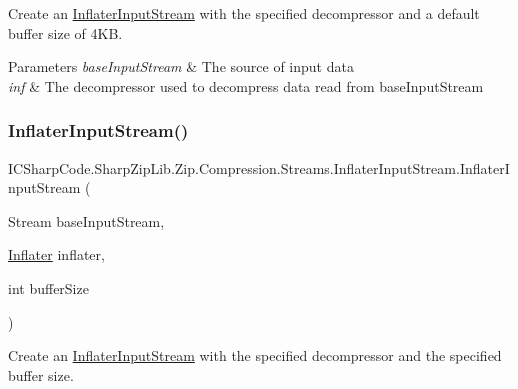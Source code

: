 Create an \hyperlink{class_i_c_sharp_code_1_1_sharp_zip_lib_1_1_zip_1_1_compression_1_1_streams_1_1_inflater_input_stream}{Inflater\+Input\+Stream} with the specified decompressor and a default buffer size of 4\+KB. 


\begin{DoxyParams}{Parameters}
{\em base\+Input\+Stream} & The source of input data \\
\hline
{\em inf} & The decompressor used to decompress data read from base\+Input\+Stream \\
\hline
\end{DoxyParams}
\mbox{\label{class_i_c_sharp_code_1_1_sharp_zip_lib_1_1_zip_1_1_compression_1_1_streams_1_1_inflater_input_stream_af988bfe68d18362c690e6f7cb0e7c0eb}} 
\subsubsection{\texorpdfstring{Inflater\+Input\+Stream()}{InflaterInputStream()}\hspace{0.1cm}{\footnotesize\ttfamily [6/6]}}
{\footnotesize\ttfamily I\+C\+Sharp\+Code.\+Sharp\+Zip\+Lib.\+Zip.\+Compression.\+Streams.\+Inflater\+Input\+Stream.\+Inflater\+Input\+Stream (\begin{DoxyParamCaption}\item[{Stream}]{base\+Input\+Stream,  }\item[{\hyperlink{class_i_c_sharp_code_1_1_sharp_zip_lib_1_1_zip_1_1_compression_1_1_inflater}{Inflater}}]{inflater,  }\item[{int}]{buffer\+Size }\end{DoxyParamCaption})\hspace{0.3cm}{\ttfamily [inline]}}



Create an \hyperlink{class_i_c_sharp_code_1_1_sharp_zip_lib_1_1_zip_1_1_compression_1_1_streams_1_1_inflater_input_stream}{Inflater\+Input\+Stream} with the specified decompressor and the specified buffer size. 


